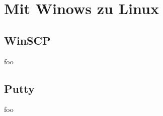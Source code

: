 \section{Mit Winows zu Linux}

\subsection{WinSCP}
\begin{frame}
	foo
\end{frame}

\subsection{Putty}
\begin{frame}
	foo
\end{frame}